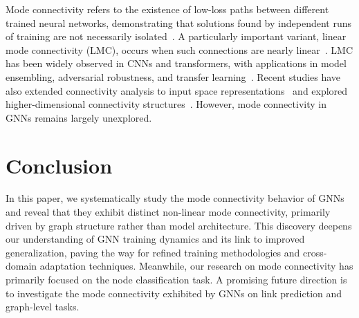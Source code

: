     Mode connectivity refers to the existence of low-loss paths between different trained neural networks, demonstrating that solutions found by independent runs of training are not necessarily isolated~\citep{freeman2016topology, garipov2018loss, draxler2018essentially}. %
    A particularly important variant, linear mode connectivity (LMC), occurs when such connections are nearly linear~\citep{frankle2020linear, entezari2021role}. LMC has been widely observed in CNNs and transformers, with applications in model ensembling, adversarial robustness, and transfer learning~\citep{juneja2022linear, qin2022exploring, abdollahpourrostam2024unveiling}. Recent studies have also extended connectivity analysis to input space representations~\citep{vrabel2024input} and explored higher-dimensional connectivity structures~\citep{anonymous2024revisiting}. However, mode connectivity in GNNs remains largely unexplored. %

\section{Conclusion}
\label{sec: conclusion}
In this paper, we systematically study the mode connectivity behavior of GNNs and reveal that they exhibit distinct non-linear mode connectivity, primarily driven by graph structure rather than model architecture. This discovery deepens our understanding of GNN training dynamics and its link to improved generalization, paving the way for refined training methodologies and cross-domain adaptation techniques. Meanwhile, our research on mode connectivity has primarily focused on the node classification task. A promising future direction is to investigate the mode connectivity exhibited by GNNs on link prediction and graph-level tasks.



